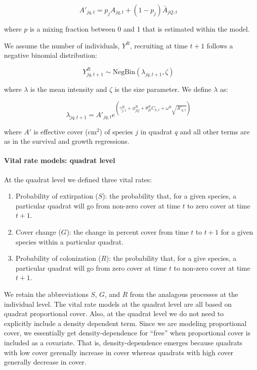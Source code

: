 \documentclass[12pt,]{article}
\begin{document}
\begin{equation}
A'_{jq,t} = p_{j}A_{jq,t} + (1-p_{j})\bar{A}_{jQ,t}
\end{equation}

where $p$ is a mixing fraction between 0 and 1 that is estimated within
the model.

We assume the number of individuals, $Y^{R}$, recruiting at time $t+1$
follows a negative binomial distribution:

\begin{equation}
Y^{R}_{jq,t+1} \sim \text{NegBin}(\lambda_{jq,t+1},\zeta)
\end{equation}

where $\lambda$ is the mean intensity and $\zeta$ is the size parameter.
We define $\lambda$ as:

\begin{equation}
\lambda_{jq,t+1} = A'_{jq,t}e^{(\gamma^{R}_{j,t} + \phi^{R}_{jQ} + \theta^{R}_{jk}C_{k,t} + \omega^{R}\sqrt{A'_{q,t}})}
\end{equation}

where $A'$ is effective cover ($\text{cm}^2$) of species $j$ in quadrat
$q$ and all other terms are as in the survival and growth regressions.

\paragraph{Vital rate models: quadrat
level}\label{vital-rate-models-quadrat-level}

At the quadrat level we defined three vital rates:

\begin{enumerate}
\def\labelenumi{\arabic{enumi}.}
\itemsep1pt\parskip0pt
\item
  Probability of extirpation ($S$): the probability that, for a given
  species, a particular quadrat will go from non-zero cover at time $t$
  to zero cover at time $t+1$.
\item
  Cover change ($G$): the change in percent cover from time $t$ to $t+1$
  for a given species within a particular quadrat.
\item
  Probability of colonization ($R$): the probability that, for a give
  species, a particular quadrat will go from zero cover at time $t$ to
  non-zero cover at time $t+1$.
\end{enumerate}

We retain the abbreviations $S$, $G$, and $R$ from the analagous
processes at the individual level. The vital rate models at the quadrat
level are all based on quadrat proportional cover. Also, at the quadrat
level we do not need to explicitly include a density dependent term.
Since we are modeling proportional cover, we essentially get
density-dependence for ``free'' when proportional cover is included as a
covariate. That is, density-dependence emerges because quadrats with low
cover gerenally increase in cover whereas quadrats with high cover
generally decrease in cover.
\end{document}
